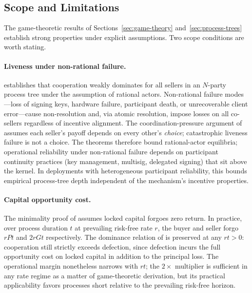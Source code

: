 \documentclass[11pt,a4paper]{article}
\theoremstyle{definition}
\theoremstyle{remark}
\newcommand{\cumval}{G}        %
\begin{document}
\subsection{Scope and Limitations}
\label{sec:limitations}

The game-theoretic results of
Sections~\ref{sec:game-theory} and~\ref{sec:process-trees} establish
strong properties under explicit assumptions. Two scope conditions are
worth stating.

\paragraph{Liveness under non-rational failure.}
 establishes that cooperation weakly dominates
for all sellers in an $N$-party process tree under the assumption of
rational actors. Non-rational failure modes---loss of signing keys,
hardware failure, participant death, or unrecoverable client
error---cause non-resolution and, via atomic resolution, impose losses
on all co-sellers regardless of incentive alignment. The
coordination-pressure argument of
 assumes each seller's payoff depends
on every other's \emph{choice}; catastrophic liveness failure is not a
choice. The theorems therefore bound rational-actor equilibria;
operational reliability under non-rational failure depends on
participant continuity practices (key management, multisig, delegated
signing) that sit above the kernel. In deployments with heterogeneous
participant reliability, this bounds empirical process-tree depth
independent of the mechanism's incentive properties.

\paragraph{Capital opportunity cost.}
The minimality proof of  assumes locked capital
forgoes zero return. In practice, over process duration $t$ at
prevailing risk-free rate $r$, the buyer and seller forgo $rPt$ and
$2r\cumval t$ respectively. The dominance relation of
 is preserved at any $rt > 0$: cooperation
still strictly exceeds defection, since defection incurs the full
opportunity cost on locked capital in addition to the principal loss.
The operational margin nonetheless narrows with $rt$; the $2\times$
multiplier is sufficient in any rate regime as a matter of
game-theoretic derivation, but its practical applicability favors
processes short relative to the prevailing risk-free horizon.
\end{document}
